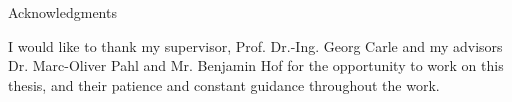 \thispagestyle{empty}

\vspace*{2cm}

\begin{center}
{ Acknowledgments}
\end{center}

\vspace{1cm}

I would like to thank my supervisor, Prof. Dr.-Ing. Georg Carle and my advisors Dr. Marc-Oliver Pahl and Mr. Benjamin Hof for the opportunity to work on this thesis, and their patience and constant guidance throughout the work.

\cleardoublepage{}
